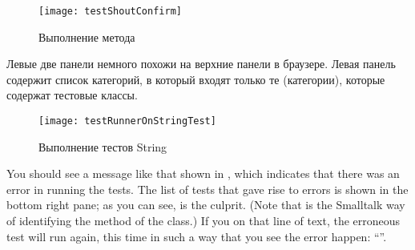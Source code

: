 \documentclass[a4paper,10pt,twoside]{book}
\begin{document}
\begin{figure}[htb]
\centerline {\texttt{[image: testShoutConfirm]}}
\caption{Выполнение метода 
}
\end{figure}






Левые две панели немного похожи на верхние панели в браузере.
Левая панель содержит список категорий, в который входят только
те (категории), которые содержат тестовые классы. 



\begin{figure}[hbt]
\centerline {\texttt{[image: testRunnerOnStringTest]}}
\caption{Выполнение тестов String
}
\end{figure}

You should see a message like that shown in , which indicates that there was an error in running the tests.  The list of tests that gave rise to errors is shown in the bottom right pane; as you can see,  is the culprit.
(Note that  is the Smalltalk way of identifying the  method of the  class.)
If you \click on that line of text, the erroneous test will run again, this time in such a way that you see the error happen: ``''.
\end{document}
